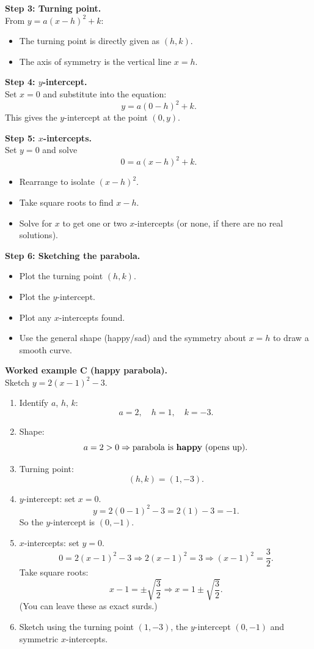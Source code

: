 \documentclass[12pt,a4paper]{article}
\begin{document}
\textbf{Step 3: Turning point.}\\[0.3ex]
From $y = a(x-h)^2 + k$:
\begin{itemize}
  \item The turning point is directly given as $(h,k)$.
  \item The axis of symmetry is the vertical line $x = h$.
\end{itemize}

\textbf{Step 4: $y$-intercept.}\\[0.3ex]
Set $x = 0$ and substitute into the equation:
\[
y = a(0-h)^2 + k.
\]
This gives the $y$-intercept at the point $(0,y)$.

\textbf{Step 5: $x$-intercepts.}\\[0.3ex]
Set $y = 0$ and solve
\[
0 = a(x-h)^2 + k.
\]
\begin{itemize}
  \item Rearrange to isolate $(x-h)^2$.
  \item Take square roots to find $x-h$.
  \item Solve for $x$ to get one or two $x$-intercepts (or none, if there are no real solutions).
\end{itemize}

\textbf{Step 6: Sketching the parabola.}\\[0.3ex]
\begin{itemize}
  \item Plot the turning point $(h,k)$.
  \item Plot the $y$-intercept.
  \item Plot any $x$-intercepts found.
  \item Use the general shape (happy/sad) and the symmetry about $x = h$ to draw a smooth curve.
\end{itemize}

\vspace{0.6cm}
\textbf{Worked example C (happy parabola).}\\[0.4ex]
Sketch $y = 2(x-1)^2 - 3$.

\begin{enumerate}
  \item Identify $a$, $h$, $k$:
  \[
  a = 2,\quad h = 1,\quad k = -3.
  \]
  \item Shape:
  \[
  a = 2 > 0 \Rightarrow \text{parabola is \textbf{happy} (opens up).}
  \]
  \item Turning point:
  \[
  (h,k) = (1,-3).
  \]
  \item $y$-intercept: set $x = 0$.
  \[
  y = 2(0-1)^2 - 3 = 2(1) - 3 = -1.
  \]
  So the $y$-intercept is $(0,-1)$.
  \item $x$-intercepts: set $y = 0$.
  \[
  0 = 2(x-1)^2 - 3
  \Rightarrow 2(x-1)^2 = 3
  \Rightarrow (x-1)^2 = \frac{3}{2}.
  \]
  Take square roots:
  \[
  x - 1 = \pm\sqrt{\frac{3}{2}}
  \Rightarrow x = 1 \pm \sqrt{\frac{3}{2}}.
  \]
  (You can leave these as exact surds.)
  \item Sketch using the turning point $(1,-3)$, the $y$-intercept $(0,-1)$ and symmetric $x$-intercepts.
\end{enumerate}
\end{document}
